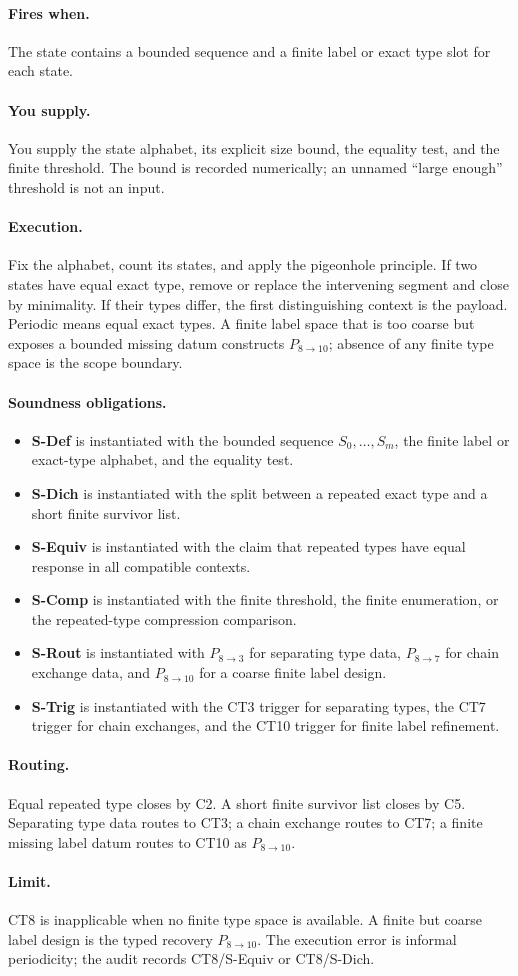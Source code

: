 \documentclass[
  11pt,
]{article}
\providecommand{\tightlist}{%
  \setlength{\itemsep}{0pt}\setlength{\parskip}{0pt}}
\theoremstyle{definition}
\newcommand{\ctpar}[1]{\paragraph{#1.}}
\begin{document}
\ctpar{Fires when}
The state contains a bounded sequence and a finite label or exact type
slot for each state.

\ctpar{You supply}
You supply the state alphabet, its explicit size bound, the equality
test, and the finite threshold.  The bound is recorded numerically; an
unnamed ``large enough'' threshold is not an input.

\ctpar{Execution}
Fix the alphabet, count its states, and apply the pigeonhole principle.
If two states have equal exact type, remove or replace the intervening
segment and close by minimality.  If their types differ, the first
distinguishing context is the payload.  Periodic means equal exact types.
A finite label space that is too coarse but exposes a bounded missing
datum constructs \(P_{8\to10}\); absence of any finite type space is the
scope boundary.

\ctpar{Soundness obligations}
\begin{itemize}
\tightlist
\item \textbf{S-Def} is instantiated with the bounded sequence \(S_0,\ldots,S_m\), the finite label or exact-type alphabet, and the equality test.
\item \textbf{S-Dich} is instantiated with the split between a repeated exact type and a short finite survivor list.
\item \textbf{S-Equiv} is instantiated with the claim that repeated types have equal response in all compatible contexts.
\item \textbf{S-Comp} is instantiated with the finite threshold, the finite enumeration, or the repeated-type compression comparison.
\item \textbf{S-Rout} is instantiated with \(P_{8\to3}\) for separating type data, \(P_{8\to7}\) for chain exchange data, and \(P_{8\to10}\) for a coarse finite label design.
\item \textbf{S-Trig} is instantiated with the CT3 trigger for separating types, the CT7 trigger for chain exchanges, and the CT10 trigger for finite label refinement.
\end{itemize}

\ctpar{Routing}
Equal repeated type closes by C2.  A short finite survivor list closes by
C5.  Separating type data routes to CT3; a chain exchange routes to CT7;
a finite missing label datum routes to CT10 as \(P_{8\to10}\).

\ctpar{Limit}
CT8 is inapplicable when no finite type space is available. A finite but
coarse label design is the typed recovery \(P_{8\to10}\).  The execution
error is informal periodicity; the audit records CT8/S-Equiv or CT8/S-Dich.
\end{document}
